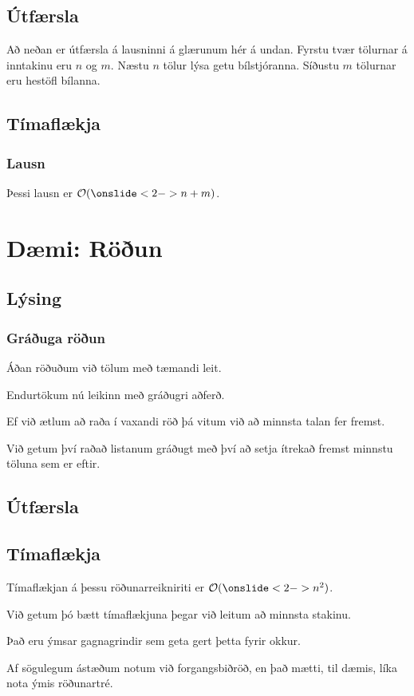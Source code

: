 \subsection{Útfærsla}
{
    {
        \item<1-> Að neðan er útfærsla á lausninni á glærunum hér á undan. Fyrstu tvær tölurnar á inntakinu eru $n$ og $m$. 
            Næstu $n$ tölur lýsa getu bílstjóranna.
            Síðustu $m$ tölurnar eru hestöfl bílanna.
        \item<2->[] 
    }
}

\subsection{Tímaflækja}
{
    \frametitle{Lausn}
    {
        \item<1-> Þessi lausn er $\mathcal{O}(\onslide<2->{n + m})$.
    }
}

\section{Dæmi: Röðun}
\subsection{Lýsing}
{
    \frametitle{Gráðuga röðun}
    {
        \item<1-> Áðan röðuðum við tölum með tæmandi leit.
        \item<2-> Endurtökum nú leikinn með gráðugri aðferð.
        \item<3-> Ef við ætlum að raða í vaxandi röð þá vitum við að minnsta talan fer fremst.
        \item<4-> Við getum því raðað listanum gráðugt með því að setja ítrekað fremst minnstu töluna sem er eftir.
    }
}

\subsection{Útfærsla}
{
}

\subsection{Tímaflækja}
{
    {
        \item<1-> Tímaflækjan á þessu röðunarreikniriti er $\mathcal{O}(\onslide<2->{n^2})$.
        \item<3-> Við getum þó bætt tímaflækjuna þegar við leitum að minnsta stakinu.
        \item<4-> Það eru ýmsar gagnagrindir sem geta gert þetta fyrir okkur.
        \item<5-> Af sögulegum ástæðum notum við forgangsbiðröð, en það mætti, til dæmis, líka nota ýmis röðunartré.
    }
}

